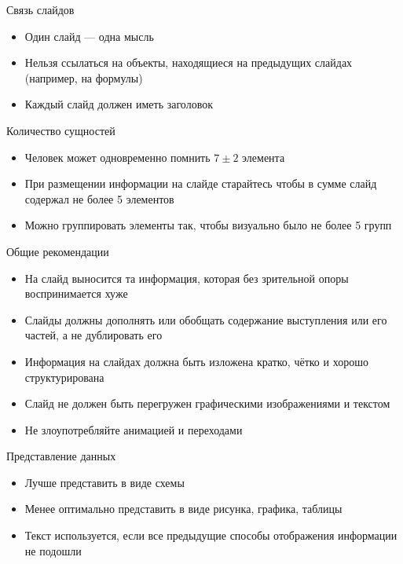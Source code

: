 \documentclass[
  ignorenonframetext,
  aspectratio=169,
]{beamer}
\providecommand{\tightlist}{%
  \setlength{\itemsep}{0pt}\setlength{\parskip}{0pt}}\usepackage{longtable,booktabs,array}
\begin{document}
\begin{frame}{Связь слайдов}
\label{ux441ux432ux44fux437ux44c-ux441ux43bux430ux439ux434ux43eux432}
\begin{itemize}[<+->]
\tightlist
\item
  Один слайд --- одна мысль
\item
  Нельзя ссылаться на объекты, находящиеся на предыдущих слайдах
  (например, на формулы)
\item
  Каждый слайд должен иметь заголовок
\end{itemize}
\end{frame}

\begin{frame}{Количество сущностей}
\label{ux43aux43eux43bux438ux447ux435ux441ux442ux432ux43e-ux441ux443ux449ux43dux43eux441ux442ux435ux439}
\begin{itemize}[<+->]
\tightlist
\item
  Человек может одновременно помнить \(7 \pm 2\) элемента
\item
  При размещении информации на слайде старайтесь чтобы в сумме слайд
  содержал не более 5 элементов
\item
  Можно группировать элементы так, чтобы визуально было не более 5 групп
\end{itemize}
\end{frame}

\begin{frame}{Общие рекомендации}
\label{ux43eux431ux449ux438ux435-ux440ux435ux43aux43eux43cux435ux43dux434ux430ux446ux438ux438}
\begin{itemize}[<+->]
\tightlist
\item
  На слайд выносится та информация, которая без зрительной опоры
  воспринимается хуже
\item
  Слайды должны дополнять или обобщать содержание выступления или его
  частей, а не дублировать его
\item
  Информация на слайдах должна быть изложена кратко, чётко и хорошо
  структурирована
\item
  Слайд не должен быть перегружен графическими изображениями и текстом
\item
  Не злоупотребляйте анимацией и переходами
\end{itemize}
\end{frame}

\begin{frame}{Представление данных}
\label{ux43fux440ux435ux434ux441ux442ux430ux432ux43bux435ux43dux438ux435-ux434ux430ux43dux43dux44bux445}
\begin{itemize}[<+->]
\tightlist
\item
  Лучше представить в виде схемы
\item
  Менее оптимально представить в виде рисунка, графика, таблицы
\item
  Текст используется, если все предыдущие способы отображения информации
  не подошли
\end{itemize}
\end{frame}
\end{document}
